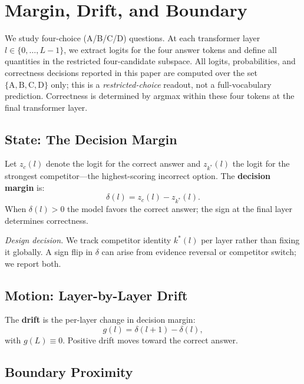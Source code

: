 \documentclass{article}
\begin{document}
\section{Margin, Drift, and Boundary}
\label{sec:primitives}

We study four-choice (A/B/C/D) questions.  At each transformer layer $l \in \{0,\ldots,L{-}1\}$, we extract logits for the four answer tokens and define all quantities in the restricted four-candidate subspace.  All logits, probabilities, and correctness decisions reported in this paper are computed over the set $\{\mathrm{A}, \mathrm{B}, \mathrm{C}, \mathrm{D}\}$ only; this is a \emph{restricted-choice} readout, not a full-vocabulary prediction.  Correctness is determined by argmax within these four tokens at the final transformer layer.

\subsection{State: The Decision Margin}

Let $z_c(l)$ denote the logit for the correct answer and $z_{k^*}(l)$ the logit for the strongest competitor---the highest-scoring incorrect option.  The \textbf{decision margin} is:
\begin{equation}
  \delta(l) = z_c(l) - z_{k^*}(l).
  \label{eq:delta}
\end{equation}
When $\delta(l) > 0$ the model favors the correct answer; the sign at the final layer determines correctness.

\emph{Design decision.}  We track competitor identity $k^*(l)$ per layer rather than fixing it globally.  A sign flip in $\delta$ can arise from evidence reversal or competitor switch; we report both.

\subsection{Motion: Layer-by-Layer Drift}

The \textbf{drift} is the per-layer change in decision margin:
\begin{equation}
  g(l) = \delta(l{+}1) - \delta(l),
  \label{eq:drift}
\end{equation}
with $g(L) \equiv 0$.  Positive drift moves toward the correct answer.

\subsection{Boundary Proximity}
\end{document}

